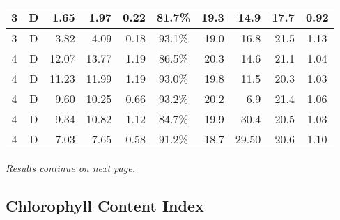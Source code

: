 \documentclass{report}
\begin{document}
\begin{table}[h]
\begin{tabular}{c|c|r|r|r|c|r|r|r|c}
    3            & D             & 1.65               & 1.97                & 0.22             & 81.7\%            & 19.3                     & 14.9         & 17.7                     & 0.92         \\ \hline
    3            & D             & 3.82               & 4.09                & 0.18             & 93.1\%            & 19.0                     & 16.8         & 21.5                     & 1.13         \\ \hline
    4            & D             & 12.07              & 13.77               & 1.19             & 86.5\%            & 20.3                     & 14.6         & 21.1                     & 1.04         \\ \hline
    4            & D             & 11.23              & 11.99               & 1.19             & 93.0\%            & 19.8                     & 11.5         & 20.3                     & 1.03         \\ \hline
    4            & D             & 9.60               & 10.25               & 0.66             & 93.2\%            & 20.2                     & 6.9          & 21.4                     & 1.06         \\ \hline
    4            & D             & 9.34               & 10.82               & 1.12             & 84.7\%            & 19.9                     & 30.4         & 20.5                     & 1.03         \\ \hline
    4            & D             & 7.03               & 7.65                & 0.58             & 91.2\%            & 18.7                     & 29.50        & 20.6                     & 1.10         \\
    \end{tabular}
\end{table}

\vfill

\textit{Results continue on next page.}

\vspace{1cm}

\clearpage

\subsection{Chlorophyll Content Index}


\pgfplotsset{width=0.9\textwidth,compat=1.9}
\end{document}
